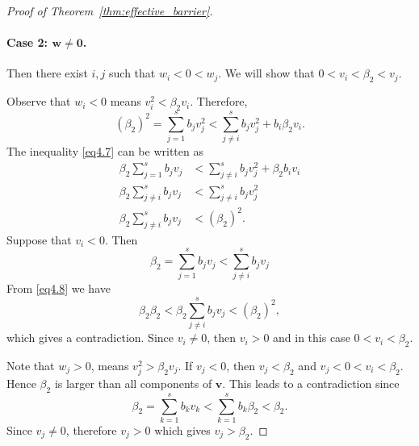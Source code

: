 \begin{proof}[Proof of Theorem~\ref{thm:effective_barrier}]
\paragraph{Case 2: $\bm{w} \neq \bm{0}$.}
Then there exist $i,j$ such that $w_i<0<w_j$.
     We will show that $0 < v_{i} < \beta_{2} < v_{j}$.

    Observe that $w_i<0$ means $v_{i}^{2} < \beta_{2}v_{i}$. Therefore,
    \begin{equation}\label{eq4.7}
        (\beta_{2})^{2} = \sum_{j=1}^{s}b_{j}v_{j}^{2} < \sum_{j \neq i}^{s}b_{j}v_{j}^{2} + b_{i}\beta_{2}v_{i}.
    \end{equation}
    The inequality \eqref{eq4.7} can be written as
    \begin{equation}\label{eq4.8}
        \begin{split}
            \beta_{2}\sum_{j=1}^{s}b_{j}v_{j} &< \sum_{j \neq i}^{s}b_{j}v_{j}^{2} + \beta_{2}b_{i}v_{i} \\
            \beta_{2}\sum_{j \neq i}^{s}b_{j}v_{j} &< \sum_{j \neq i}^{s}b_{j}v_{j}^{2} \\
            \beta_{2}\sum_{j \neq i}^{s}b_{j}v_{j} &< (\beta_{2})^{2}.
        \end{split}
    \end{equation}
    Suppose that $v_{i} < 0$. Then
    \begin{equation*}
        \beta_{2} = \sum_{j=1}^{s}b_{j}v_{j} < \sum_{j \neq i}^{s}b_{j}v_{j}
    \end{equation*}
    From \eqref{eq4.8} we have
    \begin{equation*}
            \beta_{2}\beta_{2} < \beta_{2}\sum_{j \neq i}^{s}b_{j}v_{j} < (\beta_{2})^{2},
    \end{equation*}
    which gives a contradiction. Since $v_{i} \neq 0$, then $v_{i} > 0$ and in this case $0 < v_{i} < \beta_{2}$.

    Note that $w_{j} > 0$, means $v_{j}^{2} > \beta_{2}v_{j}$. If $v_{j} < 0$, then $v_{j} < \beta_{2}$ and $v_{j} < 0 < v_{i} < \beta_{2}$. Hence $\beta_{2}$ is larger than all components of $\bm{v}$. This leads to a contradiction since
    \begin{equation*}
            \beta_{2} = \sum_{k=1}^{s}b_{k}v_{k} < \sum_{k=1}^{s}b_{k}\beta_{2} < \beta_{2}.
    \end{equation*}
    Since $v_{j}\ne0$, therefore $v_{j} > 0$ which gives $v_{j} > \beta_{2}$.


\end{proof}
